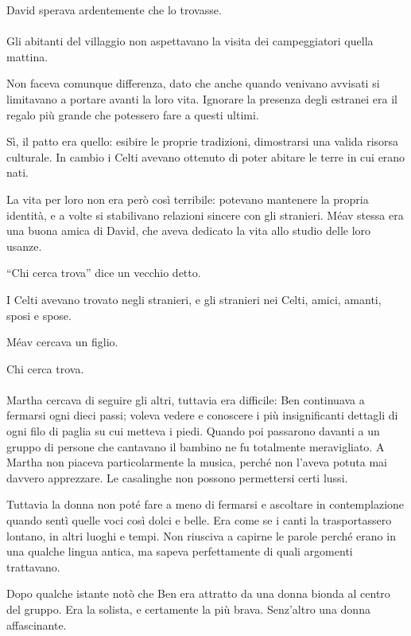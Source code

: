 \documentclass[a4paper,12pt]{book}
\begin{document}
David sperava ardentemente che lo trovasse.

\paragraph{}
Gli abitanti del villaggio non aspettavano la visita dei campeggiatori quella
mattina.

Non faceva comunque differenza, dato che anche quando venivano avvisati si
limitavano a portare avanti la loro vita. Ignorare la presenza degli estranei
era il regalo più grande che potessero fare a questi ultimi.

Sì, il patto era quello: esibire le proprie tradizioni, dimostrarsi una valida
risorsa culturale. In cambio i Celti avevano ottenuto di poter abitare le terre
in cui erano nati.

La vita per loro non era però così terribile: potevano mantenere la propria
identità, e a volte si stabilivano relazioni sincere con gli stranieri. Méav
stessa era una buona amica di David, che aveva dedicato la vita allo studio
delle loro usanze.

``Chi cerca trova'' dice un vecchio detto.

I Celti avevano trovato negli stranieri, e gli stranieri nei Celti, amici,
amanti, sposi e spose.

Méav cercava un figlio.

Chi cerca trova.

\paragraph{}
Martha cercava di seguire gli altri, tuttavia era difficile: Ben continuava a
fermarsi ogni dieci passi; voleva vedere e conoscere i più insignificanti
dettagli di ogni filo di paglia su cui metteva i piedi. Quando poi passarono
davanti a un gruppo di persone che cantavano il bambino ne fu totalmente
meravigliato. A Martha non piaceva particolarmente la musica, perché non
l'aveva potuta mai davvero apprezzare. Le casalinghe non possono permettersi
certi lussi.

Tuttavia la donna non poté fare a meno di fermarsi e ascoltare in
contemplazione quando sentì quelle voci così dolci e belle. Era come se i
canti la trasportassero lontano, in altri luoghi e tempi. Non riusciva a capirne
le parole perché erano in una qualche lingua antica, ma sapeva perfettamente di
quali argomenti trattavano.

Dopo qualche istante notò che Ben era attratto da una donna bionda al centro
del gruppo. Era la solista, e certamente la più brava. Senz'altro una donna
affascinante.
\end{document}
